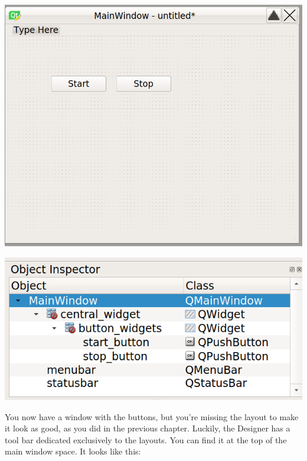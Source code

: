 \begin{minipage}{0.45\linewidth}
    \centering
    \includegraphics[width=\textwidth]{images/Chapter_09/05_main_window_buttons.png}
\end{minipage}
\hspace{0.5cm}
\begin{minipage}{0.45\linewidth}
    \centering
    \includegraphics[width=\textwidth]{images/Chapter_09/05_main_window_structure.png}
\end{minipage}


You now have a window with the buttons, but you're missing the layout to make it look as good, as you did in the previous chapter. Luckily, the Designer has a tool bar dedicated exclusively to the layouts. You can find it at the top of the main window space. It looks like this:

